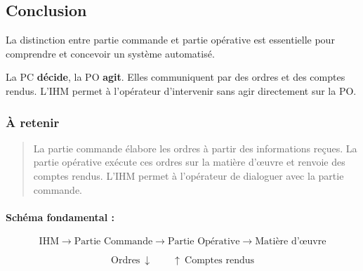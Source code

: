 \subsection{Conclusion}

La distinction entre partie commande et partie opérative est essentielle pour comprendre et concevoir un système automatisé.

La PC \textbf{décide}, la PO \textbf{agit}. Elles communiquent par des ordres et des comptes rendus. L'IHM permet à l'opérateur d'intervenir sans agir directement sur la PO.

\subsubsection*{À retenir}

\begin{quote}
La partie commande élabore les ordres à partir des informations reçues. La partie opérative exécute ces ordres sur la matière d'œuvre et renvoie des comptes rendus. L'IHM permet à l'opérateur de dialoguer avec la partie commande.
\end{quote}

\paragraph{Schéma fondamental :}

\[
\text{IHM} \rightarrow \text{Partie Commande} \rightarrow \text{Partie Opérative} \rightarrow \text{Matière d'œuvre}
\]

\[
\text{Ordres} \ \downarrow \qquad \uparrow \ \text{Comptes rendus}
\]